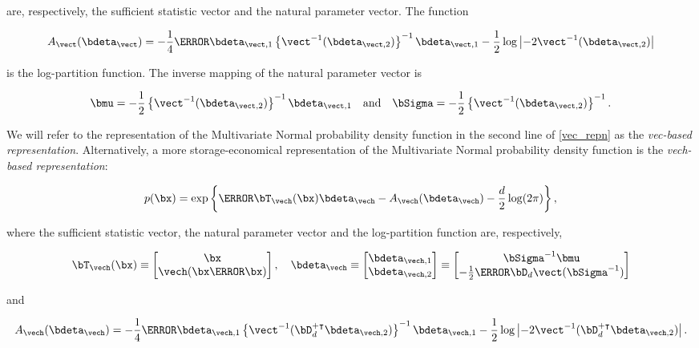 \documentclass[12pt]{article}
\theoremstyle{plain}
\theoremstyle{definition}
\theoremstyle{remark}
\begin{document}
\noindent are, respectively, the sufficient statistic vector and the natural parameter vector. The function

\[
	A_{\vect} (\bdeta_{\vect}) =
		-\frac14 \T{\bdeta}_{\vect, 1} \left\{ \vect^{-1} (\bdeta_{\vect, 2}) \right\}^{-1} \bdeta_{\vect, 1}
		- \frac12 \log \left| -2 \vect^{-1} (\bdeta_{\vect, 2}) \right|
\]

\noindent is the log-partition function. The inverse mapping of the natural parameter vector is
\cite[equation~S.4]{wand17}

\begin{equation}
	\bmu = -\frac12 \left\{ \vect^{-1} (\bdeta_{\vect, 2}) \right\}^{-1} \bdeta_{\vect, 1} \quad
	\text{and} \quad
	\bSigma = -\frac12 \left\{ \vect^{-1} (\bdeta_{\vect, 2}) \right\}^{-1}.
\label{gauss_vec_comm_params}
\end{equation}

\noindent We will refer to the representation of the Multivariate Normal probability density function in the second
line of \eqref{vec_repn} as the \emph{vec-based representation}. Alternatively, a more storage-economical
representation of the Multivariate Normal probability density function is the \emph{vech-based representation}:

\[
	p (\bx) = \exp \left\{ \T{\bT_{\vech} (\bx)} \bdeta_{\vech} - A_{\vech} (\bdeta_{\vech}) - \frac{d}{2} \log (2 \pi) \right\},
\]

\noindent where the sufficient statistic vector, the natural parameter vector and the log-partition function are,
respectively,

\[
	\bT_{\vech} (\bx) \equiv \begin{bmatrix}
		\bx \\
		\vech (\bx \T{\bx})
	\end{bmatrix}, \quad
	\bdeta_{\vech} \equiv \begin{bmatrix}
		\bdeta_{\vech, 1} \\
		\bdeta_{\vech, 2}
	\end{bmatrix} \equiv \begin{bmatrix}
		\bSigma^{-1} \bmu \\
		-\frac12 \T{\bD_d} \vect(\bSigma^{-1})
	\end{bmatrix}
\]

\noindent and

\[
	A_{\vech} (\bdeta_{\vech}) =
		-\frac14 \T{\bdeta}_{\vech, 1} \left\{
			\vect^{-1} (\bD_d^{+ \intercal} \bdeta_{\vech, 2})
		\right\}^{-1} \bdeta_{\vech, 1}
		- \frac12 \log \left| -2 \vect^{-1} (\bD_d^{+ \intercal} \bdeta_{\vech, 2}) \right|.
\]
\end{document}
